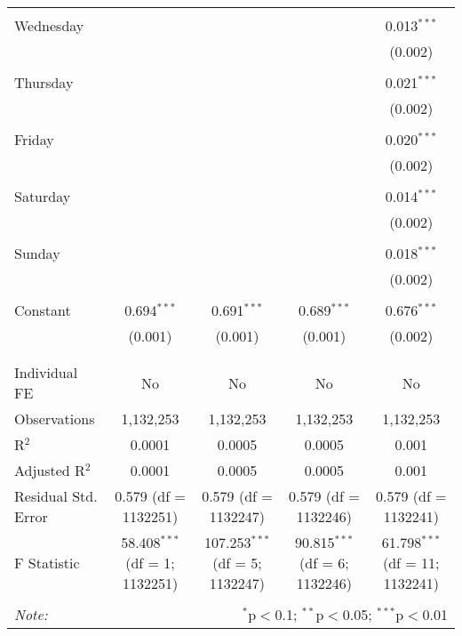 \documentclass[
]{article}
\begin{document}
\begin{table}[!htbp]
{\begin{tabular}{@{\extracolsep{5pt}}lcccc}
  & & & & \\ 
 Wednesday &  &  &  & 0.013$^{***}$ \\ 
  &  &  &  & (0.002) \\ 
  & & & & \\ 
 Thursday &  &  &  & 0.021$^{***}$ \\ 
  &  &  &  & (0.002) \\ 
  & & & & \\ 
 Friday &  &  &  & 0.020$^{***}$ \\ 
  &  &  &  & (0.002) \\ 
  & & & & \\ 
 Saturday &  &  &  & 0.014$^{***}$ \\ 
  &  &  &  & (0.002) \\ 
  & & & & \\ 
 Sunday &  &  &  & 0.018$^{***}$ \\ 
  &  &  &  & (0.002) \\ 
  & & & & \\ 
 Constant & 0.694$^{***}$ & 0.691$^{***}$ & 0.689$^{***}$ & 0.676$^{***}$ \\ 
  & (0.001) & (0.001) & (0.001) & (0.002) \\ 
  & & & & \\ 
\hline \\[-1.8ex] 
Individual FE & No & No & No & No \\ 
Observations & 1,132,253 & 1,132,253 & 1,132,253 & 1,132,253 \\ 
R$^{2}$ & 0.0001 & 0.0005 & 0.0005 & 0.001 \\ 
Adjusted R$^{2}$ & 0.0001 & 0.0005 & 0.0005 & 0.001 \\ 
Residual Std. Error & 0.579 (df = 1132251) & 0.579 (df = 1132247) & 0.579 (df = 1132246) & 0.579 (df = 1132241) \\ 
F Statistic & 58.408$^{***}$ (df = 1; 1132251) & 107.253$^{***}$ (df = 5; 1132247) & 90.815$^{***}$ (df = 6; 1132246) & 61.798$^{***}$ (df = 11; 1132241) \\ 
\hline 
\hline \\[-1.8ex] 
\textit{Note:}  & \multicolumn{4}{r}{$^{*}$p$<$0.1; $^{**}$p$<$0.05; $^{***}$p$<$0.01} \\ 
\end{tabular}
} 
\end{table} 
\newpage
\end{document}
